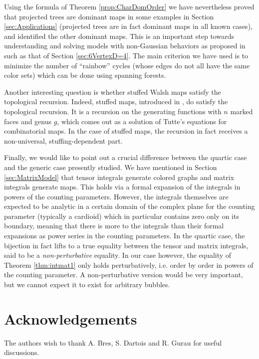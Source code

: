 \documentclass[aps,prd,10pt,notitlepage,nofootinbib,superscriptaddress,showkeys,showpacs]{revtex4-1}
\begin{document}
Using the formula of Theorem \ref{prop:CharDomOrder} we have nevertheless proved that projected trees are dominant maps in some examples in Section \ref{sec:Applications} (projected trees are in fact dominant maps in all known cases), and identified the other dominant maps. This is an important step towards understanding and solving models with non-Gaussian behaviors as proposed in \cite{New1/N} such as that of Section \ref{sec:6VertexD=4}. The main criterion we have used is to minimize the number of \enquote{rainbow} cycles (whose edges do not all have the same color sets) which can be done using spanning forests.

Another interesting question is whether stuffed Walsh maps satisfy the topological recursion. Indeed, stuffed maps, introduced in \cite{Stuffed}, do satisfy the topological recursion. It is a recursion on the generating functions with $n$ marked faces and genus $g$, which comes out as a solution of Tutte's equations for combinatorial maps. In the case of stuffed maps, the recursion in fact receives a non-universal, stuffing-dependent part.

Finally, we would like to point out a crucial difference between the quartic case and the generic case presently studied. We have mentioned in Section \ref{sec:MatrixModel} that tensor integrals generate colored graphs and matrix integrals generate maps. This holds via a formal expansion of the integrals in powers of the counting parameters. However, the integrals themselves are expected to be analytic in a certain domain of the complex plane for the counting parameter (typically a cardioid) which in particular contains zero only on its boundary, meaning that there is more to the integrals than their formal expansions as power series in the counting parameters. In the quartic case, the bijection in fact lifts to a true equality between the tensor and matrix integrals, said to be a \emph{non-perturbative} equality. In our case however, the equality of Theorem \ref{thm:intmat1} only holds perturbatively, i.e. order by order in powers of the counting parameter. A non-perturbative version would be very important, but we cannot expect it to exist for arbitrary bubbles.

\section*{Acknowledgements}

The authors wish to thank A. Bres, S. Dartois and R. Gurau for useful discussions.
\end{document}

